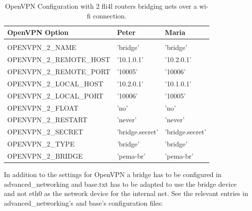 \begin{table}[htbp]
  \begin{scriptsize}
    \begin{tabular}{lll}
      OpenVPN Option           & Peter           & Maria           \\
      \hline \\
      OPENVPN\_2\_NAME         & 'bridge'        & 'bridge'          \\
      OPENVPN\_2\_REMOTE\_HOST & '10.1.0.1'      & '10.2.0.1'      \\
      OPENVPN\_2\_REMOTE\_PORT & '10005'         & '10006'         \\
      OPENVPN\_2\_LOCAL\_HOST  & '10.2.0.1'      & '10.1.0.1'      \\
      OPENVPN\_2\_LOCAL\_PORT  & '10006'         & '10005'         \\
      OPENVPN\_2\_FLOAT        & 'no'            & 'no'            \\
      OPENVPN\_2\_RESTART      & 'never'         & 'never'         \\
      OPENVPN\_2\_SECRET       & 'bridge.secret' & 'bridge.secret' \\
      OPENVPN\_2\_TYPE         & 'bridge'        & 'bridge'        \\
      OPENVPN\_2\_BRIDGE       & 'pema-br'       & 'pema-br'       \\
    \end{tabular}
  \end{scriptsize}
  \caption{OpenVPN Configuration with 2 fli4l routers bridging nets over a wi-fi connection.}
\end{table}

In addition to the settings for OpenVPN a bridge has to be configured 
in advanced\_networking and base.txt has to be adapted to use the bridge device 
and not eth0 as the network device for the internal net. See the relevant 
entries in advanced\_networking's and base's configuration files:

